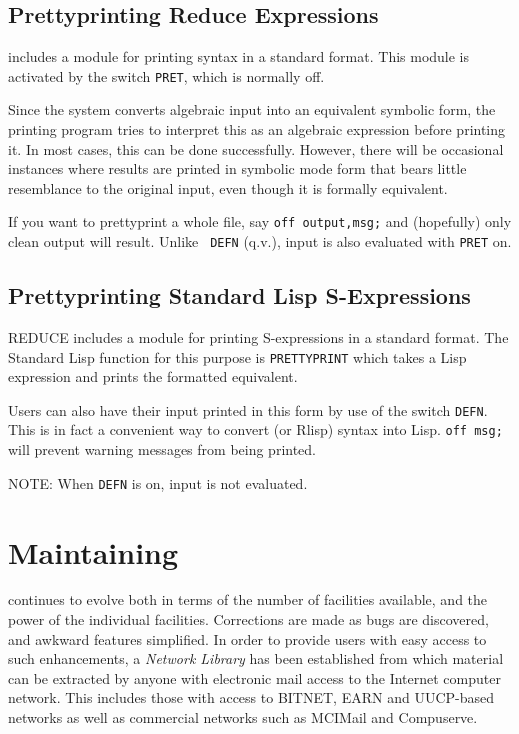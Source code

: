 \section{Prettyprinting Reduce Expressions} 

{\REDUCE} includes a module for printing {\REDUCE} syntax in a standard
format.  This module is activated by the switch {\tt PRET},
 which is normally off.

Since the system converts algebraic input into an equivalent symbolic form,
the printing program tries to interpret this as an algebraic expression
before printing it. In most cases, this can be done successfully. However,
there will be occasional instances where results are printed in symbolic
mode form that bears little resemblance to the original input, even though
it is formally equivalent.

If you want to prettyprint a whole file, say {\tt off output,msg;}
 and (hopefully) only clean output will result.  Unlike {\tt
DEFN} (q.v.),  input is also evaluated with {\tt PRET}
 on.

\section{Prettyprinting Standard Lisp S-Expressions} 

REDUCE includes a module for printing
S-expressions in a standard format.  The Standard Lisp function for this
purpose is {\tt PRETTYPRINT}  which takes a Lisp
expression and prints the formatted equivalent.

Users can also have their {\REDUCE} input printed in this form by use of
the switch {\tt DEFN}.  This is in fact a convenient way to
convert {\REDUCE} (or Rlisp) syntax into Lisp. {\tt off msg;} will prevent
warning messages from being printed.

NOTE: When {\tt DEFN} is on, input is not evaluated.

\chapter {Maintaining {\REDUCE}}

{\REDUCE} continues to evolve both in terms of the number of facilities
available, and the power of the individual facilities.  Corrections are
made as bugs are discovered, and awkward features simplified.  In order to
provide users with easy access to such enhancements, a {\em {\REDUCE}
Network Library} has been established from which material can be extracted
by anyone with electronic mail access to the Internet computer network.
This includes those with access to BITNET, EARN and UUCP-based networks as
well as commercial networks such as MCIMail and Compuserve.

